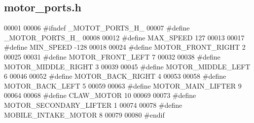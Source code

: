 \subsection{motor\+\_\+ports.\+h}
\label{motor__ports_8h_source}

\begin{DoxyCode}
00001 
00006 \textcolor{preprocessor}{#ifndef \_MOTOT\_PORTS\_H\_}
00007 \textcolor{preprocessor}{#define \_MOTOR\_PORTS\_H\_}
00008 
00012 \textcolor{preprocessor}{#define MAX\_SPEED 127}
00013 
00017 \textcolor{preprocessor}{#define MIN\_SPEED -128}
00018 
00024 \textcolor{preprocessor}{#define MOTOR\_FRONT\_RIGHT 2}
00025 
00031 \textcolor{preprocessor}{#define MOTOR\_FRONT\_LEFT 7}
00032 
00038 \textcolor{preprocessor}{#define MOTOR\_MIDDLE\_RIGHT 3}
00039 
00045 \textcolor{preprocessor}{#define MOTOR\_MIDDLE\_LEFT 6}
00046 
00052 \textcolor{preprocessor}{#define MOTOR\_BACK\_RIGHT 4}
00053 
00058 \textcolor{preprocessor}{#define MOTOR\_BACK\_LEFT 5}
00059 
00063 \textcolor{preprocessor}{#define MOTOR\_MAIN\_LIFTER 9}
00064 
00068 \textcolor{preprocessor}{#define CLAW\_MOTOR 10}
00069 
00073 \textcolor{preprocessor}{#define MOTOR\_SECONDARY\_LIFTER 1}
00074 
00078 \textcolor{preprocessor}{#define MOBILE\_INTAKE\_MOTOR 8}
00079 
00080 \textcolor{preprocessor}{#endif}
\end{DoxyCode}
